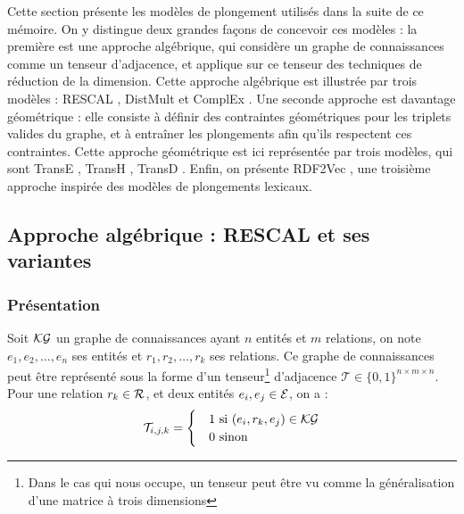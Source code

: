 Cette section présente les modèles de plongement utilisés dans la suite de ce mémoire. On y distingue deux grandes façons de concevoir ces modèles : la première est une approche algébrique, qui considère un graphe de connaissances comme un tenseur d'adjacence, et applique sur ce tenseur des techniques de réduction de la dimension. %
Cette approche algébrique est illustrée par trois modèles : RESCAL \cite{rescal}, DistMult \cite{distmult} et ComplEx \cite{complex}. Une seconde approche est davantage géométrique : elle consiste à définir des contraintes géométriques pour les triplets valides du graphe, et à entraîner les plongements afin qu'ils respectent ces contraintes. %
Cette approche géométrique est ici représentée par trois modèles, qui sont TransE \cite{bordes2013translating}, TransH \cite{transh}, TransD \cite{transd}. 
Enfin, on présente RDF2Vec \cite{ristoski2016rdf2vec}, une troisième approche inspirée des modèles de plongements lexicaux.


\subsection{Approche algébrique : RESCAL et ses variantes}
\label{subsec:kge-models-mult}

\subsubsection{Présentation}


Soit $\mathcal{KG}$ un graphe de connaissances ayant $n$ entités et $m$ relations, on note $e_1, e_2, \ldots, e_n$ ses entités et $r_1, r_2, \ldots, r_k$ ses relations. Ce graphe de connaissances peut être représenté sous la forme d'un tenseur\footnote{Dans le cas qui nous occupe, un tenseur peut être vu comme la généralisation d'une matrice à trois dimensions} d'adjacence $\mathcal{T} \in \{0, 1\}^{n \times m \times n}$. Pour une relation $r_k \in \mathcal{R}$, et deux entités $e_i, e_j \in \mathcal{E}$, on a :
\begin{equation}
    \mathcal{T}_{i, j, k} = \begin{cases}
    &1 \text{ si } (e_i, r_k, e_j) \in \mathcal{KG} \\
    &0 \text{ sinon}
    \end{cases}
\end{equation}

